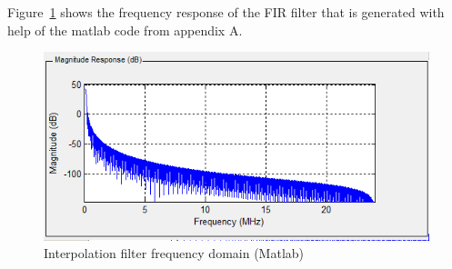 \documentclass[a4paper,twoside,11pt, fleqn]{article}
\begin{document}
Figure~\ref{fig:frq} shows the frequency response of the FIR filter that is generated with help of the matlab code from appendix A.

\begin{figure}[h]
	\includegraphics[scale=0.67]{Images/frequencyplot}
    \caption{Interpolation filter frequency domain (Matlab)}
    \label{fig:frq}
\end{figure}

\newpage
\end{document}
